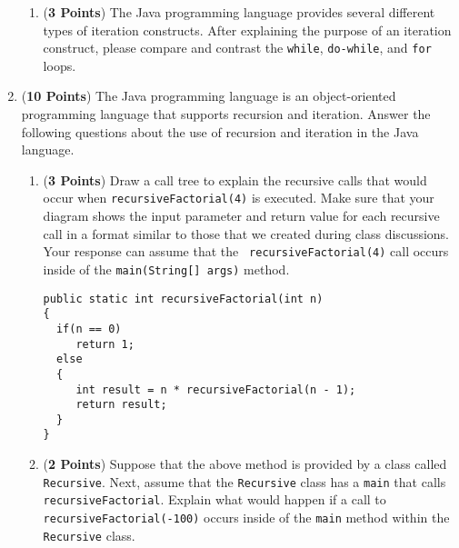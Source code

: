 \documentclass[12pt]{article}
\begin{document}
\begin{enumerate}
\begin{enumerate}

\item ({\bf 3 Points}) The Java programming language provides several different types of iteration constructs.  After
  explaining the purpose of an iteration construct, please compare and contrast the {\tt while}, {\tt do-while}, and
  {\tt for} loops.

\end{enumerate}

\newpage

\item ({\bf 10 Points}) The Java programming language is an
  object-oriented programming language that supports recursion and
  iteration.  Answer the following questions about the use of
  recursion and iteration in the Java language.

\begin{enumerate}
  
\item ({\bf 3 Points}) Draw a call tree to explain the recursive calls that would occur when {\tt recursiveFactorial(4)}
  is executed.  Make sure that your diagram shows the input parameter and return value for each recursive call in a
  format similar to those that we created during class discussions.  Your response can assume that the {\tt
  recursiveFactorial(4)} call occurs inside of the {\tt main(String[] args)} method.

\begin{verbatim}
public static int recursiveFactorial(int n)
{
  if(n == 0)
     return 1;
  else
  {
     int result = n * recursiveFactorial(n - 1);
     return result;
  }
} 
\end{verbatim}

\item ({\bf 2 Points}) Suppose that the above method is provided by a
  class called {\tt Recursive}.  Next, assume that the {\tt Recursive}
  class has a {\tt main} that calls {\tt recursiveFactorial}.  Explain
  what would happen if a call to {\tt recursiveFactorial(-100)} occurs
  inside of the {\tt main} method within the {\tt Recursive} class.


\end{enumerate}
\end{enumerate}
\end{document}
